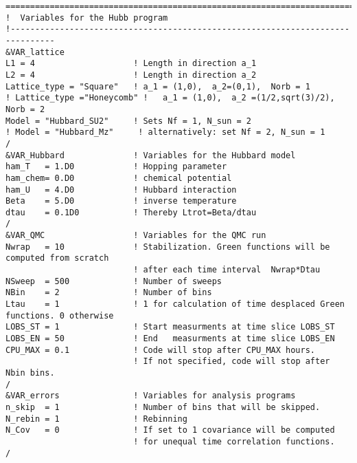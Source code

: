 \begin{lstlisting} 
===============================================================================
!  Variables for the Hubb program
!-------------------------------------------------------------------------------
&VAR_lattice
L1 = 4                    ! Length in direction a_1
L2 = 4                    ! Length in direction a_2
Lattice_type = "Square"	  ! a_1 = (1,0),  a_2=(0,1),  Norb = 1
! Lattice_type ="Honeycomb" !   a_1 = (1,0),  a_2 =(1/2,sqrt(3)/2), Norb = 2
Model = "Hubbard_SU2"     ! Sets Nf = 1, N_sun = 2
! Model = "Hubbard_Mz"     ! alternatively: set Nf = 2, N_sun = 1
/
&VAR_Hubbard              ! Variables for the Hubbard model
ham_T   = 1.D0            ! Hopping parameter
ham_chem= 0.D0            ! chemical potential
ham_U   = 4.D0            ! Hubbard interaction
Beta    = 5.D0            ! inverse temperature
dtau    = 0.1D0           ! Thereby Ltrot=Beta/dtau
/
&VAR_QMC                  ! Variables for the QMC run
Nwrap   = 10              ! Stabilization. Green functions will be computed from scratch 
                          ! after each time interval  Nwrap*Dtau
NSweep  = 500             ! Number of sweeps
NBin    = 2               ! Number of bins
Ltau    = 1               ! 1 for calculation of time desplaced Green functions. 0 otherwise
LOBS_ST = 1               ! Start measurments at time slice LOBS_ST
LOBS_EN = 50              ! End   measurments at time slice LOBS_EN
CPU_MAX = 0.1             ! Code will stop after CPU_MAX hours. 
                          ! If not specified, code will stop after Nbin bins.
/                          
&VAR_errors               ! Variables for analysis programs
n_skip  = 1               ! Number of bins that will be skipped. 
N_rebin = 1               ! Rebinning  
N_Cov   = 0               ! If set to 1 covariance will be computed
                          ! for unequal time correlation functions.                   
/            
\end{lstlisting}
%

